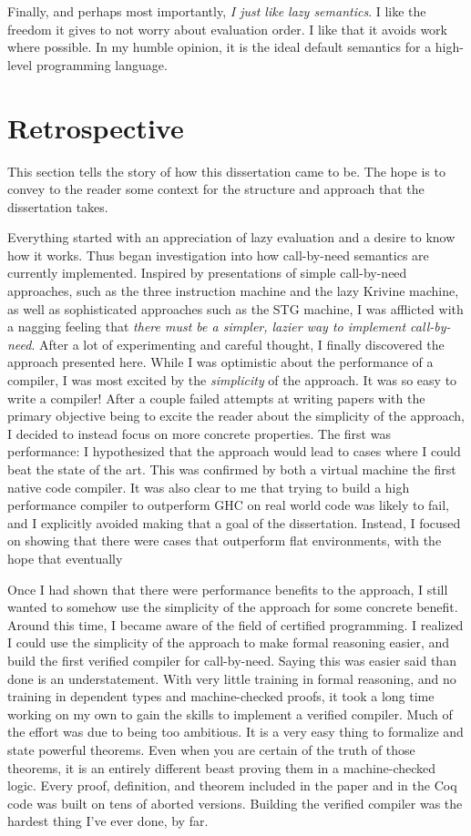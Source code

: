 Finally, and perhaps most importantly, \emph{I just like lazy semantics}. I like
the freedom it gives to not worry about evaluation order. I like that it avoids
work where possible. In my humble opinion, it is the ideal default semantics for
a high-level programming language.   

\section{Retrospective}

This section tells the story of how this dissertation came to be. The hope is to
convey to the reader some context for the structure and approach that the
dissertation takes. 

Everything started with an appreciation of lazy evaluation and a desire to know
how it works. Thus began investigation into how call-by-need semantics are
currently implemented. Inspired by presentations of simple call-by-need
approaches, such as the three instruction machine and the lazy Krivine machine,
as well as sophisticated approaches such as the STG machine, I was afflicted
with a nagging feeling that \emph{there must be a simpler, lazier way to
implement call-by-need}. After a lot of experimenting and careful thought, I
finally discovered the approach presented here. While I was optimistic about the
performance of a compiler, I was most excited by the \emph{simplicity} of the
approach. It was so easy to write a compiler! After a couple failed attempts at
writing papers with the primary objective being to excite the reader about
the simplicity of the approach, I decided to instead focus on more concrete
properties. The first was performance: I hypothesized that the approach would
lead to cases where I could beat the state of the art. This was confirmed by
both a virtual machine the first native code compiler. It was also clear to me
that trying to build a high performance compiler to outperform GHC on real world
code was likely to fail, and I explicitly avoided making that a goal of the
dissertation. Instead, I focused on showing that there were cases that
outperform flat environments, with the hope that eventually 

Once I had shown that there were performance benefits to the approach, I still
wanted to somehow use the simplicity of the approach for some concrete benefit.
Around this time, I became aware of the field of certified programming. I
realized I could use the simplicity of the approach to make formal reasoning
easier, and build the first verified compiler for call-by-need. Saying this was
easier said than done is an understatement. With very little training in formal
reasoning, and no training in dependent types and machine-checked proofs, it
took a long time working on my own to gain the skills to implement a verified
compiler. Much of the effort was due to being too ambitious. It is a very easy
thing to formalize and state powerful theorems. Even when you are certain of the
truth of those theorems, it is an entirely different beast proving them in a
machine-checked logic. Every proof, definition, and theorem included in the
paper and in the Coq code was built on tens of aborted versions. Building the
verified compiler was the hardest thing I've ever done, by far.

